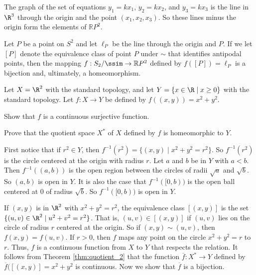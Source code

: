 \item The graph of the set of equations $y_1 = kx_1$, $y_2 = kx_2$, and $y_3 = kx_3$ is the line in $\R^3$ through the origin and the point $(x_1, x_2, x_3)$. So these lines minus the origin form the elements of $\mathbb{R}P^2$.

\item Let $P$ be a point on $S^2$ and let $\ell_P$ be the line through the origin and $P$. If we let $[P]$ denote the equivalence class of point $P$ under $\sim$ that identifies antipodal points, then the mapping $f: S_2/\ssim \to \mathbb{R}P^2$ defined by $f([P]) = \ell_P$ is a bijection and, ultimately, a homeomorphism.

\item 

\ea


\item Let $X = \R^2$ with the standard topology, and let $Y = \{x \in \R \mid x \geq 0\}$ with the standard topology. Let $f: X \to Y$ be defined by $f((x,y)) = x^2+y^2$. 
\ba
\item Show that $f$ is a continuous surjective function.

\item Prove that the quotient space $X^{*}$ of $X$ defined by $f$ is homeomorphic to $Y$.

\ea



\ExerciseSolution 

\ba

\item First notice that if $r^2 \in Y$, then $f^{-1}(r^2) = \{(x,y) \mid x^2+y^2 = r^2\}$. So $f^{-1}(r^2)$ is the circle centered at the origin with radius $r$. Let $a$ and $b$ be in $Y$ with $a < b$. Then $f^{-1}((a,b))$ is the open region between the circles of radii $\sqrt{a}$ and $\sqrt{b}$. So $(a,b)$ is open in $Y$. It is also the case that $f^{-1}([0,b))$ is the open ball centered at $0$ of radius $\sqrt{b}$. So $f^{-1}([0,b))$ is open in $Y$.  

\item If $(x,y)$ is in $\R^2$ with $x^2+y^2 = r^2$, the equivalence class $[(x,y)]$ is the set $\{(u,v) \in \R^2 \mid u^2+v^2 = r^2\}$. That is, $(u,v) \in [(x,y)]$ if $(u,v)$ lies on the circle of radius $r$ centered at the origin. So if $(x,y) \sim (u,v)$, then $f(x,y) = f(u,v)$.   If $r > 0$, then $f$ maps any point on the circle $x^2+y^2 = r$ to $r$. Thus, $f$ is a continuous function from $X$ to $Y$ that respects the relation. It follows from Theorem \ref{thm:quotient_2} that the function $\overline{f}: X^* \to Y$ defined by $\overline{f}([(x,y)] = x^2+y^2$ is continuous. Now we show that $\overline{f}$ is a bijection.

